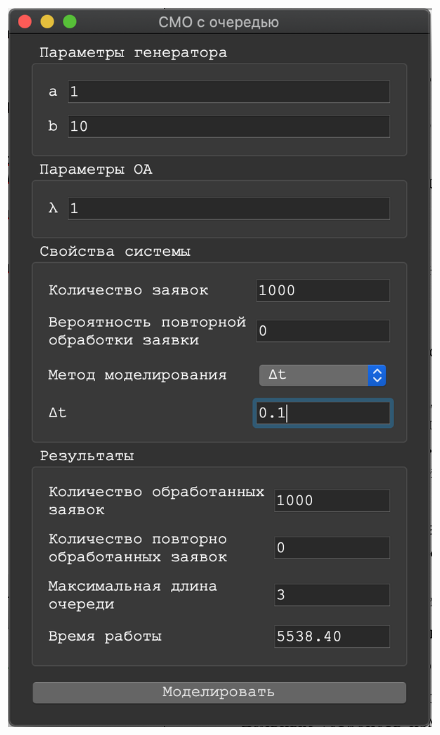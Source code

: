 \documentclass[a4paper,12pt]{article}
\begin{document}
\begin{figure}[h!]
\begin{minipage}[b]{0.32\textwidth}
			\includegraphics[width=\textwidth]{deltat_1_3.png}
		\end{minipage}
		\label{ris:deltat_1}
	\end{figure}
\end{document}
